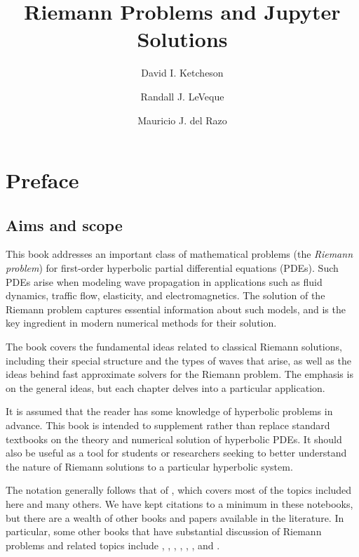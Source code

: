 \documentclass{SIAMbook2016}
\title{Riemann Problems and Jupyter Solutions}
\author{David I. Ketcheson \and Randall J. LeVeque \and Mauricio J. del Razo}
\begin{document}
    
    
    
    
\maketitle

    
    
    \tableofcontents


    
\hypertarget{preface}{%
\chapter{Preface}\label{preface}}
\label{sec:00-Preface}
\hypertarget{aims-and-scope}{%
\section{Aims and scope}\label{aims-and-scope}}

This book addresses an important class of mathematical problems (the
\emph{Riemann problem}) for first-order hyperbolic partial differential
equations (PDEs). Such PDEs arise when modeling wave propagation in
applications such as fluid dynamics, traffic flow, elasticity, and
electromagnetics. The solution of the Riemann problem captures essential
information about such models, and is the key ingredient in modern
numerical methods for their solution.

The book covers the fundamental ideas related to classical Riemann
solutions, including their special structure and the types of waves that
arise, as well as the ideas behind fast approximate solvers for the
Riemann problem. The emphasis is on the general ideas, but each chapter
delves into a particular application.

It is assumed that the reader has some knowledge of hyperbolic problems
in advance. This book is intended to supplement rather than replace
standard textbooks on the theory and numerical solution of hyperbolic
PDEs. It should also be useful as a tool for students or researchers
seeking to better understand the nature of Riemann solutions to a
particular hyperbolic system.

The notation generally follows that of \cite{fvmhp}, which covers most
of the topics included here and many others. We have kept citations to a
minimum in these notebooks, but there are a wealth of other books and
papers available in the literature. In particular, some other books that
have substantial discussion of Riemann problems and related topics
include \cite{lax:cbms}, \cite{rjl:eth}, \cite{god-rav},
\cite{kroener1997}, \cite{trangenstein2009}, \cite{toro2013riemann}, and
\cite{hesthaven2018}.
\end{document}
